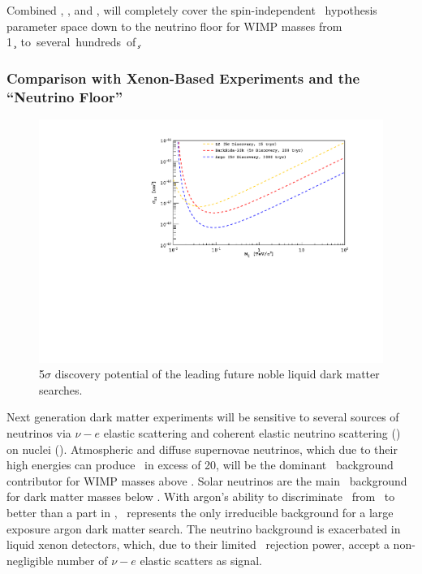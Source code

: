 Combined \DSks, \DSls, and \Argo, will completely cover the spin-independent \WIMP\ hypothesis parameter space down to the neutrino floor for WIMP masses from \SI{1}{\GeV\per\square\c} to several hundreds of \si{\TeV\per\square\c}.


\subsubsection{Comparison with Xenon-Based Experiments and the ``Neutrino Floor''}
\label{sec:IM-SC-XenonComp}

\begin{figure}
\begin{center}
\includegraphics[width=\textwidth]{./Figures/NobleDiscoveryComp.pdf}
\caption{5$\sigma$ discovery potential of the leading future noble liquid dark matter searches.}
\label{fig:NobleDiscoveryComp}
\end{center}
\end{figure}

Next generation dark matter experiments will be sensitive to several sources of neutrinos via $\nu-e$ elastic scattering and coherent elastic neutrino scattering (\CEnNS) on nuclei (\NR). Atmospheric and diffuse supernovae neutrinos, which due to their high energies can produce \NRs\ in excess of \SI{20}{\keVr}, will be the dominant \CEnNS\ background contributor for WIMP masses above \DSkHighMassThreshold. Solar neutrinos are the main \CEnNS\ background for dark matter masses below \DSlLowMassThreshold. With  argon's ability to discriminate \ER\ from \NR\ to better than a part in \DEAPPSDRejection, \CEnNS\ represents the only irreducible background for a large exposure argon dark matter search. The neutrino background is exacerbated in liquid xenon detectors, which, due to their limited \ER\ rejection power, accept a non-negligible number of $\nu-e$ elastic scatters as signal. 

